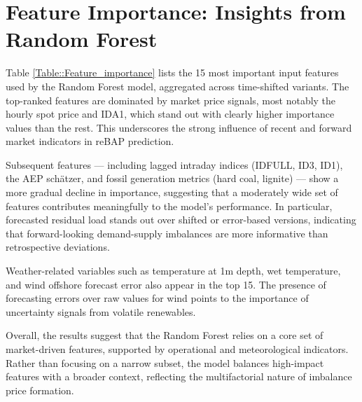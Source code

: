 \documentclass[class=scrbook, crop=false]{standalone}
\begin{document}
\section{Feature Importance: Insights from Random Forest}
\label{Section::Analysis or Evaluation of Something}    


Table  \ref{Table::Feature_importance} lists the 15 most important input features used by the Random Forest model, aggregated across time-shifted variants. The top-ranked features are dominated by market price signals, most notably the hourly spot price and IDA1, which stand out with clearly higher importance values than the rest. This underscores the strong influence of recent and forward market indicators in reBAP prediction.

Subsequent features — including lagged intraday indices (IDFULL, ID3, ID1), the AEP schätzer, and fossil generation metrics (hard coal, lignite) — show a more gradual decline in importance, suggesting that a moderately wide set of features contributes meaningfully to the model’s performance. In particular, forecasted residual load stands out over shifted or error-based versions, indicating that forward-looking demand-supply imbalances are more informative than retrospective deviations.

Weather-related variables such as temperature at 1m depth, wet temperature, and wind offshore forecast error also appear in the top 15. The presence of forecasting errors over raw values for wind points to the importance of uncertainty signals from volatile renewables.

Overall, the results suggest that the Random Forest relies on a core set of market-driven features, supported by operational and meteorological indicators. Rather than focusing on a narrow subset, the model balances high-impact features with a broader context, reflecting the multifactorial nature of imbalance price formation.



\end{document}
